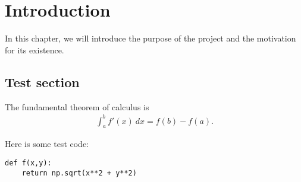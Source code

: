 \chapter{Introduction}

In this chapter, we will introduce the purpose of the project and the motivation for its existence.

\section{Test section}

\newpage

The fundamental theorem of calculus is
\begin{align}
    \int_a^b f'(x) ~ dx = f(b) - f(a).
\end{align}

\newpage

Here is some test code:
\begin{lstlisting}
def f(x,y):
    return np.sqrt(x**2 + y**2)
\end{lstlisting}